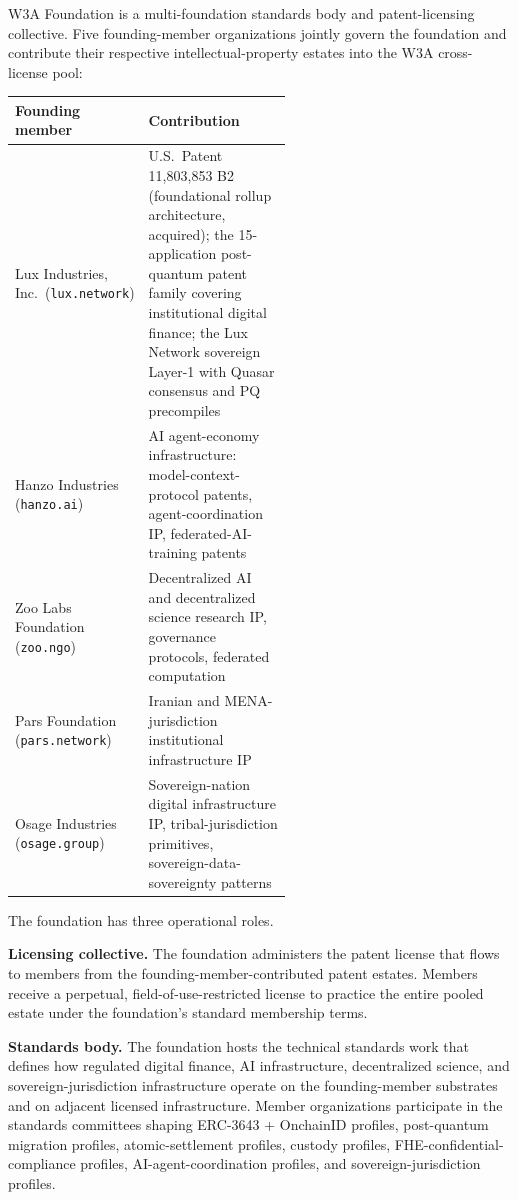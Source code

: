 \documentclass[11pt,letterpaper]{article}
\begin{document}
W3A Foundation is a multi-foundation standards body and patent-licensing collective. Five founding-member organizations jointly govern the foundation and contribute their respective intellectual-property estates into the W3A cross-license pool:

\begin{longtable}{lp{0.55\linewidth}}
\toprule
\textbf{Founding member} & \textbf{Contribution} \\
\midrule
Lux Industries, Inc.\ (\texttt{lux.network}) & U.S.\ Patent 11,803,853 B2 (foundational rollup architecture, acquired); the 15-application post-quantum patent family covering institutional digital finance; the Lux Network sovereign Layer-1 with Quasar consensus and PQ precompiles \\
Hanzo Industries (\texttt{hanzo.ai}) & AI agent-economy infrastructure: model-context-protocol patents, agent-coordination IP, federated-AI-training patents \\
Zoo Labs Foundation (\texttt{zoo.ngo}) & Decentralized AI and decentralized science research IP, governance protocols, federated computation \\
Pars Foundation (\texttt{pars.network}) & Iranian and MENA-jurisdiction institutional infrastructure IP \\
Osage Industries (\texttt{osage.group}) & Sovereign-nation digital infrastructure IP, tribal-jurisdiction primitives, sovereign-data-sovereignty patterns \\
\bottomrule
\end{longtable}

The foundation has three operational roles.

\textbf{Licensing collective.} The foundation administers the patent license that flows to members from the founding-member-contributed patent estates. Members receive a perpetual, field-of-use-restricted license to practice the entire pooled estate under the foundation's standard membership terms.

\textbf{Standards body.} The foundation hosts the technical standards work that defines how regulated digital finance, AI infrastructure, decentralized science, and sovereign-jurisdiction infrastructure operate on the founding-member substrates and on adjacent licensed infrastructure. Member organizations participate in the standards committees shaping ERC-3643 + OnchainID profiles, post-quantum migration profiles, atomic-settlement profiles, custody profiles, FHE-confidential-compliance profiles, AI-agent-coordination profiles, and sovereign-jurisdiction profiles.
\end{document}
